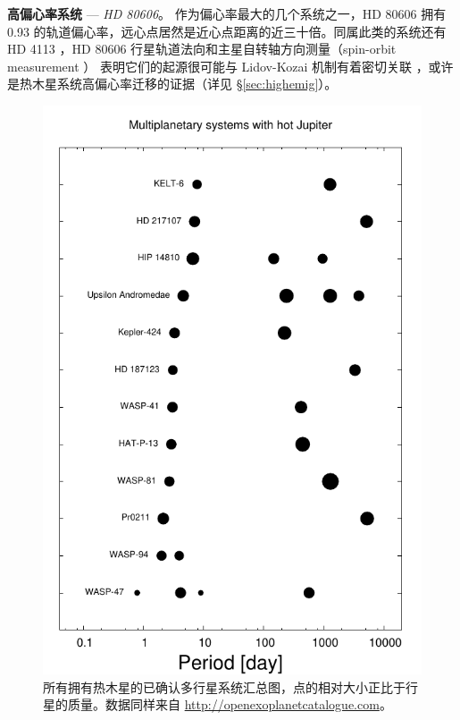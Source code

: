 \textbf{高偏心率系统} --- \textit{HD 80606}。  {}  作为偏心率最大的几个系统之一，HD 80606 拥有 0.93 
的轨道偏心率\cite{Naef2001}，远心点居然是近心点距离的近三十倍。同属此类的系统还有 HD 4113
\cite{Tamuz2008}，HD 80606 行星轨道法向和主星自转轴方向测量（spin-orbit measurement ）
\cite{Pont2009}表明它们的起源很可能与 Lidov-Kozai 机制\cite{Lidov1962,Kozai1962}有着密切关联
\cite{Wu2003}，或许是热木星系统高偏心率迁移的证据（详见 \S \ref{sec:highemig}）。


\begin{figure}[ht!]
\centering
\includegraphics[height=0.91\textheight]{figures/chapter1/fig15_hjmul.pdf}
\caption{所有拥有热木星的已确认多行星系统汇总图，点的相对大小正比于行星的质量。数据同样来自 \url{http://openexoplanetcatalogue.com}。}
\label{fig:hjwcomp}
\end{figure}


